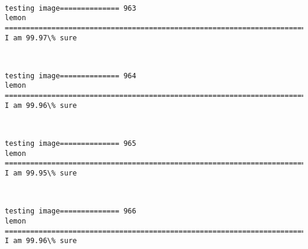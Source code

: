 \documentclass[11pt]{article}
\begin{document}
    \begin{center}
    \end{center}
    { \hspace*{\fill} \\}
    
    \begin{Verbatim}[commandchars=\\\{\}]
testing image============== 963
lemon
============================================================================
I am 99.97\% sure

    \end{Verbatim}

    \begin{center}
    \end{center}
    { \hspace*{\fill} \\}
    
    \begin{Verbatim}[commandchars=\\\{\}]
testing image============== 964
lemon
============================================================================
I am 99.96\% sure

    \end{Verbatim}

    \begin{center}
    \end{center}
    { \hspace*{\fill} \\}
    
    \begin{Verbatim}[commandchars=\\\{\}]
testing image============== 965
lemon
============================================================================
I am 99.95\% sure

    \end{Verbatim}

    \begin{center}
    \end{center}
    { \hspace*{\fill} \\}
    
    \begin{Verbatim}[commandchars=\\\{\}]
testing image============== 966
lemon
============================================================================
I am 99.96\% sure

    \end{Verbatim}
\end{document}
